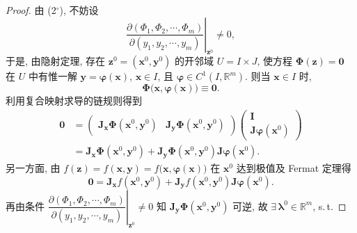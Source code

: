 \begin{proof}
由 (2$^{\circ}$), 不妨设
\[
  \left.\frac{\partial(\Phi_{1}, \Phi_{2}, \cdots, \Phi_{m})}{\partial(y_{1}, y_{2}, \cdots, y_{m})}\right|_{\boldsymbol{z}^{0}} \neq 0,
\]
于是, 由隐射定理, 存在 $\boldsymbol{z}^{0} = (\boldsymbol{x}^{0}, \boldsymbol{y}^{0})$ 的开邻域 $U = I \times J$, 使方程 $\boldsymbol{\Phi}(\boldsymbol{z}) = \boldsymbol{0}$ 在 $U$ 中有惟一解 $\boldsymbol{y} = \boldsymbol{\varphi}(\boldsymbol{x})$, $\boldsymbol{x} \in I$, 且 $\boldsymbol{\varphi} \in C^{1}(I, \mathbb{R}^{m})$. 则当 $\boldsymbol{x} \in I$ 时,
\[
  \boldsymbol{\Phi}\bigl(\boldsymbol{x}, \boldsymbol{\varphi}(\boldsymbol{x})\bigr) \equiv \boldsymbol{0}.
\]
利用复合映射求导的链规则得到
\begin{equation}\label{eq:9.3.1}
  \begin{aligned}
    \boldsymbol{0} &= \begin{pmatrix} \boldsymbol{J}_{\boldsymbol{x}}\boldsymbol{\Phi}(\boldsymbol{x}^{0}, \boldsymbol{y}^{0}) & \boldsymbol{J}_{\boldsymbol{y}}\boldsymbol{\Phi}(\boldsymbol{x}^{0}, \boldsymbol{y}^{0}) \end{pmatrix}
    \begin{pmatrix} \boldsymbol{I} \\ \boldsymbol{J}\boldsymbol{\varphi}(\boldsymbol{x}^{0}) \end{pmatrix} \\
    &= \boldsymbol{J}_{\boldsymbol{x}}\boldsymbol{\Phi}(\boldsymbol{x}^{0}, \boldsymbol{y}^{0}) + \boldsymbol{J}_{\boldsymbol{y}}\boldsymbol{\Phi}(\boldsymbol{x}^{0}, \boldsymbol{y}^{0}) \boldsymbol{J}\boldsymbol{\varphi}(\boldsymbol{x}^{0}).
  \end{aligned}
\end{equation}
另一方面, 由 $f(\boldsymbol{z}) = f(\boldsymbol{x}, \boldsymbol{y}) = f\bigl(\boldsymbol{x}, \boldsymbol{\varphi}(\boldsymbol{x})\bigr)$ 在 $\boldsymbol{x}^{0}$ 达到极值及 Fermat 定理得
\begin{equation}\label{eq:9.3.2}
  \boldsymbol{0} = \boldsymbol{J}_{\boldsymbol{x}}f(\boldsymbol{x}^{0}, \boldsymbol{y}^{0}) + \boldsymbol{J}_{\boldsymbol{y}}f(\boldsymbol{x}^{0}, \boldsymbol{y}^{0}) \boldsymbol{J}\boldsymbol{\varphi}(\boldsymbol{x}^{0}).
\end{equation}
再由条件 $\left.\dfrac{\partial(\Phi_{1}, \Phi_{2}, \cdots, \Phi_{m})}{\partial(y_{1}, y_{2}, \cdots, y_{m})}\right|_{\boldsymbol{z}^{0}} \neq 0$ 知 $\boldsymbol{J}_{\boldsymbol{y}}\boldsymbol{\Phi}(\boldsymbol{x}^{0}, \boldsymbol{y}^{0})$ 可逆, 故 $\exists\, \boldsymbol{\lambda}^{0} \in \mathbb{R}^{m}$, s.\,t.

\end{proof}
